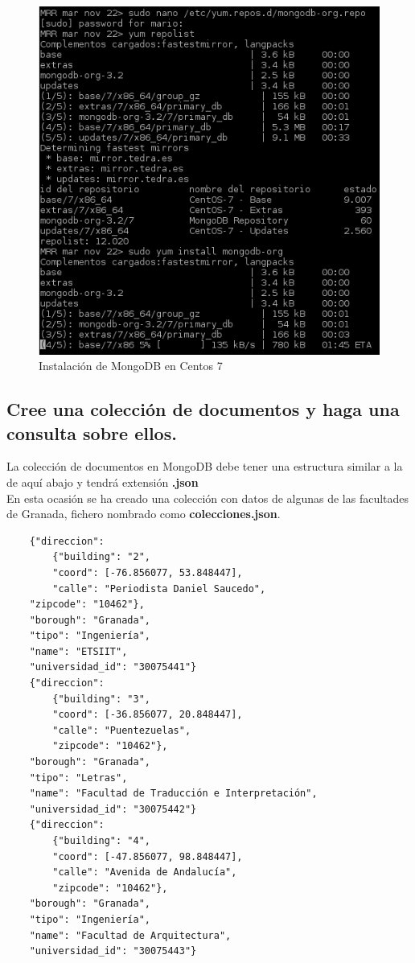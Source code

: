 \begin{itemize}
	\begin{figure}[H] %
		\centering
		\includegraphics[scale=0.5]{figuras/figura89.png} 
		\caption{Instalación de MongoDB en Centos 7} 
		\label{fig:figura89}
	\end{figure}
\end{itemize}

\subsection{Cree una colección de documentos y haga una consulta
	sobre ellos.}
	
	La colección de documentos en MongoDB debe tener una estructura similar a la de aquí abajo y tendrá extensión \textbf{.json}
	\\
	
	En esta ocasión se ha creado una colección con datos de algunas de las facultades de Granada, fichero nombrado como \textbf{colecciones.json}.
	
	\begin{lstlisting}
	{"direccion": 
		{"building": "2", 
		"coord": [-76.856077, 53.848447], 
		"calle": "Periodista Daniel Saucedo", 
	"zipcode": "10462"}, 
	"borough": "Granada", 
	"tipo": "Ingeniería", 
	"name": "ETSIIT", 
	"universidad_id": "30075441"}
	{"direccion": 
		{"building": "3", 
		"coord": [-36.856077, 20.848447], 
		"calle": "Puentezuelas", 
		"zipcode": "10462"}, 
	"borough": "Granada", 
	"tipo": "Letras", 
	"name": "Facultad de Traducción e Interpretación", 
	"universidad_id": "30075442"}
	{"direccion": 
		{"building": "4", 
		"coord": [-47.856077, 98.848447], 
		"calle": "Avenida de Andalucía", 
		"zipcode": "10462"}, 
	"borough": "Granada", 
	"tipo": "Ingeniería", 
	"name": "Facultad de Arquitectura", 
	"universidad_id": "30075443"}
	\end{lstlisting}

